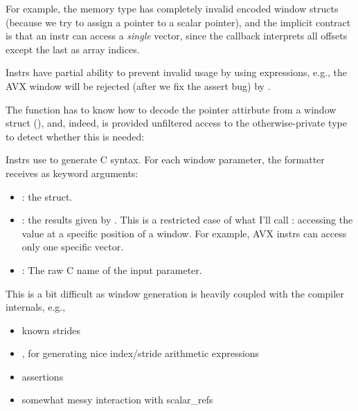 \filbreak
For example, the  memory type has completely invalid encoded window structs (because we try to assign a  pointer to a scalar  pointer), and the implicit  contract is that an instr can access a \textit{single}  vector, since the  callback interprets all offsets except the last as array indices.



\filbreak
Instrs have partial ability to prevent invalid usage by using  expressions, e.g., the AVX window  will be rejected (after we fix the assert bug) by .

\filbreak
The  function has to know how to decode the pointer attirbute from a window struct (), and, indeed, is provided unfiltered access to the otherwise-private  type to detect whether this is needed:



\filbreak
Instrs use  to generate C syntax.
For each window parameter, the formatter receives as keyword arguments:
\begin{itemize}
  \item {}: the  struct.
  \filbreak
  \item {}: the results given by .
    This is a restricted case of what I'll call : accessing the value at a specific position of a window.
    For example, AVX instrs can access only one specific  vector.
  \filbreak
  \item {}: The raw C name of the input parameter.
\end{itemize}

\filbreak
{}

This is a bit difficult as window generation is heavily coupled with the compiler internals, e.g.,

\begin{itemize}
  \item known strides
  \filbreak
  \item {}, for generating nice index/stride arithmetic expressions
  \filbreak
  \item assertions
  \filbreak
  \item somewhat messy interaction with scalar\_refs
\end{itemize}

